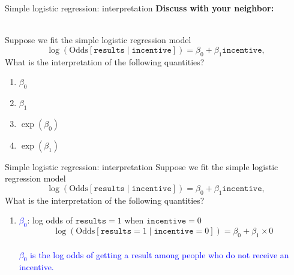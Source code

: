 \documentclass[10pt,t]{beamer}
\begin{document}
\begin{frame}{Simple logistic regression: interpretation}
	\textbf{Discuss with your neighbor:}
	\\ ~\
	
	Suppose we fit the simple logistic regression model $$\log\left(\text{Odds}[\texttt{results} \mid \texttt{incentive}]\right) = \beta_0 + \beta_1 \texttt{incentive},$$ What is the interpretation of the following quantities?
	\medskip
	\begin{enumerate}
		\item $\beta_0$
		\medskip
		\item $\beta_1$
		\medskip
		\item $\exp(\beta_0)$
		\medskip
		\item $\exp(\beta_1)$
	\end{enumerate} 
\end{frame}

\begin{frame}{Simple logistic regression: interpretation}
	Suppose we fit the simple logistic regression model $$\log\left(\text{Odds}[\texttt{results} \mid \texttt{incentive}]\right) = \beta_0 + \beta_1 \texttt{incentive},$$ What is the interpretation of the following quantities?
	\medskip
	\begin{enumerate}
		\item \textcolor{blue}{$\beta_0$}: log odds of $\texttt{results} = 1$ when $\texttt{incentive} = 0$
		$$\log\left(\text{Odds}[\texttt{results}  =1 \mid \texttt{incentive} = 0]\right) = \beta_0 + \beta_1\times 0$$\\
		
		\textcolor{blue}{$\beta_0$ is the log odds of getting a result among people who do not receive an incentive.}
	\end{enumerate} 
\end{frame}
\end{document}
